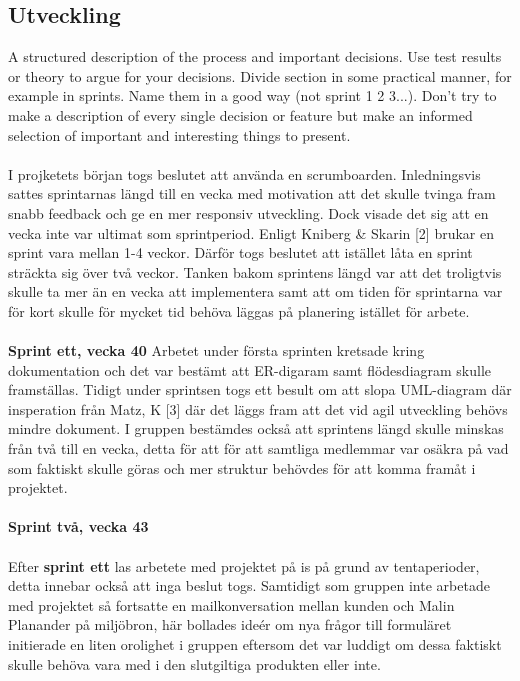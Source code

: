 \documentclass[12pt]{article}
\begin{document}
\subsection{Utveckling}
A structured description of the process and important decisions. Use test results or theory to argue for your decisions. Divide section in some practical manner, for example in sprints. Name them in a good way (not sprint 1 2 3...). Don’t try to make a description of every single decision or feature but make an informed selection of important and interesting things to present.\\\\
I projketets början togs beslutet att använda en scrumboarden. Inledningsvis sattes sprintarnas längd till en vecka med motivation att det skulle tvinga fram snabb feedback och ge en mer responsiv utveckling. Dock visade det sig att en vecka inte var ultimat som sprintperiod. Enligt Kniberg \& Skarin [2] brukar en sprint vara mellan 1-4 veckor. Därför togs beslutet att istället låta en sprint sträckta sig över två veckor. Tanken bakom sprintens längd var att det troligtvis skulle ta mer än en vecka att implementera samt att om tiden för sprintarna var för kort skulle för mycket tid behöva läggas på planering istället för arbete. \\\\
\textbf{Sprint ett, vecka 40}
Arbetet under första sprinten kretsade kring dokumentation och det var bestämt att ER-digaram samt flödesdiagram skulle framställas. Tidigt under sprintsen togs ett besult om att slopa UML-diagram där insperation från Matz, K [3] där det läggs fram att det vid agil utveckling behövs mindre dokument. 
I gruppen bestämdes också att sprintens längd skulle minskas från två till en vecka, detta för att för att samtliga medlemmar var osäkra på vad som faktiskt skulle göras och mer struktur behövdes för att komma framåt i projektet. \\\\
\textbf{Sprint två, vecka 43}\\\\
Efter \textbf{sprint ett} las arbetete med projektet på is på grund av tentaperioder, detta innebar också att inga beslut togs. Samtidigt som gruppen inte arbetade med projektet så fortsatte en mailkonversation mellan kunden och Malin Planander på miljöbron, här bollades ideér om nya frågor till formuläret initierade en liten orolighet i gruppen eftersom det var luddigt om dessa faktiskt skulle behöva vara med i den slutgiltiga produkten eller inte.\\\\
\end{document}
